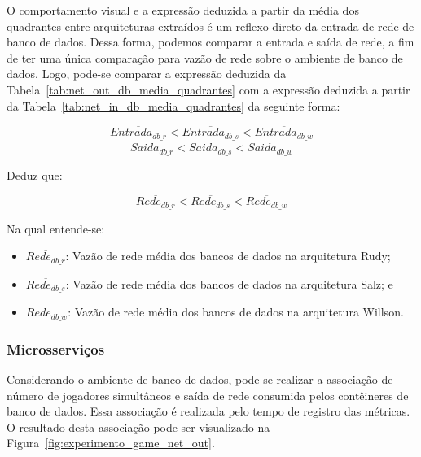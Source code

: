 O comportamento visual e a expressão deduzida a partir da média dos quadrantes entre arquiteturas extraídos é um reflexo direto da entrada de rede de banco de dados.
%
Dessa forma, podemos comparar a entrada e saída de rede, a fim de ter uma única comparação para vazão de rede sobre o ambiente de banco de dados.
%
Logo, pode-se comparar a expressão deduzida da Tabela~\ref{tab:net_out_db_media_quadrantes} com a expressão deduzida a partir da Tabela~\ref{tab:net_in_db_media_quadrantes} da seguinte forma:

$$
    \overline{Entrada_{db\_r}} < \overline{Entrada_{db\_s}} < \overline{Entrada_{db\_w}}
$$
$$
    \overline{Saida_{db\_r}} < \overline{Saida_{db\_s}} < \overline{Saida_{db\_w}}
$$

Deduz que:

$$
    \overline{Rede_{db\_r}} < \overline{Rede_{db\_s}} < \overline{Rede_{db\_w}}
$$

Na qual entende-se:

\begin{itemize}
 \item $\overline{Rede_{db\_r}}$: Vazão de rede média dos bancos de dados na arquitetura Rudy;
 \item $\overline{Rede_{db\_s}}$: Vazão de rede média dos bancos de dados na arquitetura Salz; e
 \item $\overline{Rede_{db\_w}}$: Vazão de rede média dos bancos de dados na arquitetura Willson.
\end{itemize}

\subsubsection{Microsserviços}

Considerando o ambiente de banco de dados, pode-se realizar a associação de número de jogadores simultâneos e saída de rede consumida pelos contêineres de banco de dados.
%
Essa associação é realizada pelo tempo de registro das métricas.
%
O resultado desta associação pode ser visualizado na Figura~\ref{fig:experimento_game_net_out}.

